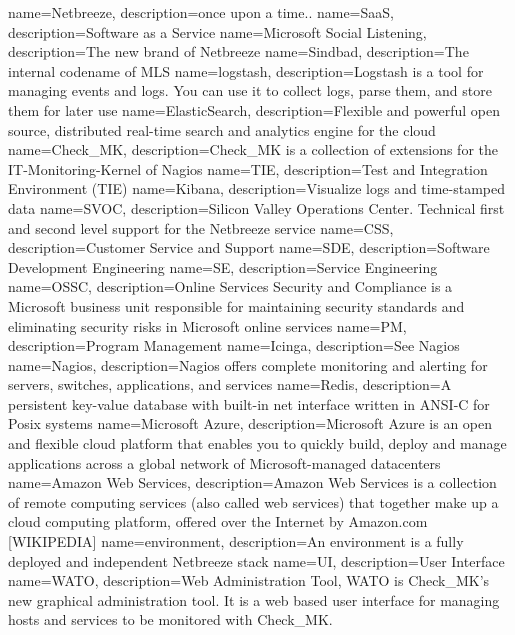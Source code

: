{
  name=Netbreeze,
  description={once upon a time..}
}
{
  name=SaaS,
  description={Software as a Service}
}
{
  name=Microsoft Social Listening,
  description={The new brand of Netbreeze}
}
{
  name=Sindbad,
  description={The internal codename of \gls{MLS}}
}
{
  name=logstash,
  description={Logstash is a tool for managing events and logs. You can use it to collect logs, parse them, and store them for later use}
}
{
  name=ElasticSearch,
  description={Flexible and powerful open source, distributed real-time search and analytics engine for the cloud}
}
{
  name=Check\_MK,
  description={Check\_MK is a collection of extensions for the IT-Monitoring-Kernel of Nagios}
}
{
  name=TIE,
  description={Test and Integration Environment (TIE)}
}
{
  name=Kibana,
  description={Visualize logs and time-stamped data}
}
{
  name=SVOC,
  description={Silicon Valley Operations Center. Technical first and second level support for the Netbreeze service}
}
{
  name=CSS,
  description={Customer Service and Support}
}
{
  name=SDE,
  description={Software Development Engineering}
}
{
  name=SE,
  description={Service Engineering}
}
{
  name=OSSC,
  description={Online Services Security and Compliance is a Microsoft business unit responsible for maintaining security standards and eliminating security risks in Microsoft online services}
}
{
  name=PM,
  description={Program Management}
}
{
  name=Icinga,
  description={See \gls{Nagios}}
}
{
  name=Nagios,
  description={Nagios offers complete monitoring and alerting for servers, switches, applications, and services}
}
{
  name=Redis,
  description={A persistent key-value database with built-in net interface written in ANSI-C for Posix systems}
}
{
  name=Microsoft Azure,
  description={Microsoft Azure is an open and flexible cloud platform that enables you to quickly build, deploy and manage applications across a global network of Microsoft-managed datacenters}
}
{
  name=Amazon Web Services,
  description={Amazon Web Services is a collection of remote computing services (also called web services) that together make up a cloud computing platform, offered over the Internet by Amazon.com [WIKIPEDIA]}
}
{
  name=environment,
  description={An environment is a fully deployed and independent Netbreeze stack}
}
{
  name=UI,
  description={User Interface}
}
{
  name=WATO,
  description={Web Administration Tool, WATO is Check\_MK's new graphical administration tool. It is a web based user interface for managing hosts and services to be monitored with Check\_MK.}
}

